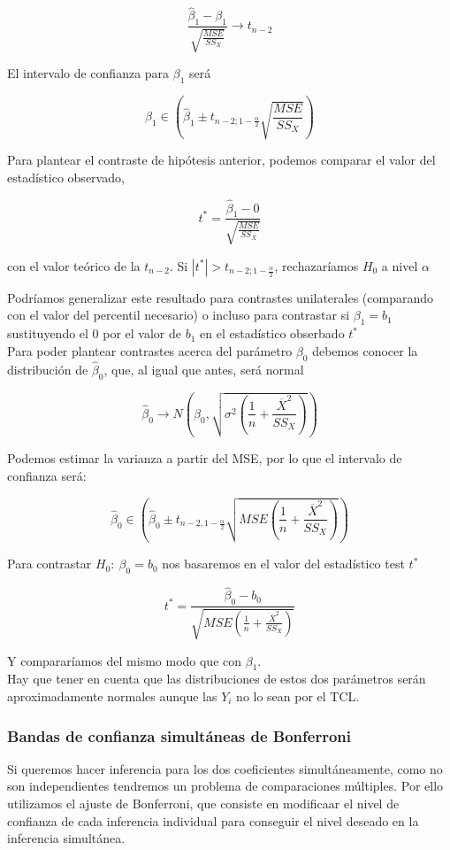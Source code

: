 $$
\frac{\hat\beta_1-\beta_1}{\sqrt{\frac{MSE}{SS_{X}}}}\longrightarrow t_{n-2}
$$

El intervalo de confianza para $\beta_1$ será

$$
\beta_1\in\left(\hat\beta_1\pm t_{n-2;1-\frac{\alpha}{2}}\sqrt{\frac{MSE}{SS_X}}\right)
$$

Para plantear el contraste de hipótesis anterior, podemos comparar el valor del estadístico observado,

$$
t^*=\frac{\hat\beta_1-0}{\sqrt{\frac{MSE}{SS_X}}}
$$

con el valor teórico de la $t_{n-2}$. Si $|t^*|>t_{n-2;1-\frac{\alpha}{2}}$, rechazaríamos $H_0$ a nivel $\alpha$

Podríamos generalizar este resultado para contrastes unilaterales (comparando con el valor del percentil necesario) o incluso para contrastar si $\beta_1=b_1$ sustituyendo el 0 por el valor de $b_1$ en el estadístico obserbado $t^*$\\

Para poder plantear contrastes acerca del parámetro $\beta_0$ debemos conocer la distribución de $\hat\beta_0$, que, al igual que antes, será normal

$$
\hat\beta_0\longrightarrow N\left(\beta_0,\sqrt{\sigma^2\left(\frac{1}{n}+\frac{\overline{X}^2}{SS_X}\right)}\right)
$$

Podemos estimar la varianza a partir del MSE, por lo que el intervalo de confianza será:

$$
\hat\beta_0\in\left(\hat\beta_0\pm t_{n-2,1-\frac{\alpha}{2}}\sqrt{MSE\left(\frac{1}{n}+\frac{\overline{X}^2}{SS_X}\right)}\right)
$$

Para contrastar $H_0:\ \beta_0=b_0$ nos basaremos en el valor del estadístico test $t^*$

$$
t^*=\frac{\hat\beta_0-b_0}{\sqrt{MSE\left(\frac{1}{n}+\frac{\overline{X}^2}{SS_X}\right)}}
$$

Y compararíamos del mismo modo que con $\beta_1$.\\

Hay que tener en cuenta que las distribuciones de estos dos parámetros serán aproximadamente normales aunque las $Y_i$ no lo sean por el TCL.

\subsubsection{Bandas de confianza simultáneas de Bonferroni }

Si queremos hacer inferencia para los dos coeficientes simultáneamente, como no son independientes tendremos un problema de comparaciones múltiples. 
Por ello utilizamos el ajuste de Bonferroni, que consiste en modificaar el nivel de confianza de cada inferencia individual para conseguir el nivel deseado en la inferencia simultánea.\\

